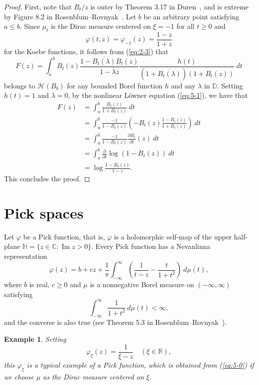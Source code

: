 \documentclass[12pt]{article}
\newtheorem{ex}[thm]{Example}
\numberwithin{equation}{section}
\newcommand{\C}{{\mathbb C}}
\newcommand{\R}{{\mathbb R}}
\newcommand{\D}{{\mathbb D}}
\newcommand{\bH}{{\mathbb H}}
\newcommand{\cH}{{\mathcal H}}
\newcommand{\p}{\partial}
\newcommand{\lam}{\lambda}
\begin{document}
\begin{proof}
First, note that 
$B_t/z$ is outer by Theorem 3.17 in Duren~\cite{Duren}, 
and is extreme by Figure 8.2 in Rosenblum--Rovnyak~\cite{RR}. 
Let $b$ be an arbitrary point satisfying $a\leq b$. 
Since $\mu_t$ is the Dirac measure centered on $\xi=-1$ for all $t\geq 0$ 
and
\[
\varphi(t,z)=\varphi_{-1}(z)=\frac{1-z}{1+z}
\]
for the Koebe functions, 
it follows from (\ref{eq:2-3}) that  
\[
F(z)=\int_a^b 
B_t(z)\frac{1-\overline{B_t(\lam)}B_t(z)}{1-\overline{\lam}z}
\frac{h(t)}{\left(1+\overline{B_t(\lam)}\right)\left(1+B_t(z)\right)}\ dt
\]
belongs to $\cH(B_b)$ for any bounded Borel function $h$ and any $\lam$ in $\D$. 
Setting $h(t)=1$ and $\lam=0$, by the nonlinear L\"{o}wner equation (\ref{eq:5-1}), we have that 
\begin{align*}
F(z)
&=\int_a^b \frac{B_t(z)}{1+B_t(z)}\ dt\\
&=\int_a^b\frac{-1}{1-B_t(z)}\left(-B_t(z)\frac{1-B_t(z)}{1+B_t(z)}\right)\ dt\\
&=\int_a^b \frac{-1}{1-B_t(z)}\frac{\p B_t}{\p t}(z)\ dt\\
&=\int_a^b \frac{\p}{\p t}\log\left(1-B_t(z) \right)\ dt\\
&=\log \frac{1-B_b(z)}{1-z}.
\end{align*}
This concludes the proof. 
\end{proof}






\section{Pick spaces}\label{sec:6}

Let $\varphi$ be a Pick function, that is, 
$\varphi$ is a holomorphic self-map of the upper half-plane $\bH=\{z\in \C: \operatorname{Im}z>0\}$. 
Every Pick function has a Nevanlinna representation 
\begin{equation}\label{eq:5-0}
\varphi(z)=b+cz+\frac{1}{\pi}\int_{-\infty}^{\infty}\left( \frac{1}{t-z}-\frac{t}{1+t^2}\right)\ d\mu(t),
\end{equation}
where $b$ is real, $c\geq 0$ and $\mu$ is a nonnegative Borel measure on $(-\infty,\infty)$ satisfying
\[
\int_{-\infty}^{\infty}\frac{1}{1+t^2}\ d\mu(t)<\infty,
\]
and the converse is also true (see Theorem 5.3 in Rosenblum--Rovnyak~\cite{RR}). 

\begin{ex}\label{ex:5-1}\rm
Setting 
\[
\varphi_{\xi}(z)=\frac{1}{\xi -z}\quad (\xi \in \R),
\]
this $\varphi_{\xi}$ is a typical example of a Pick function, 
which is obtained from (\ref{eq:5-0}) if we choose $\mu$ as the Dirac measure centered on $\xi$. 
\end{ex}
\end{document}
